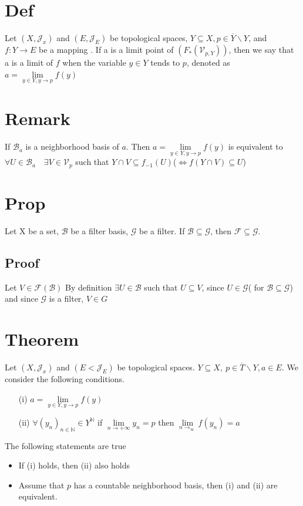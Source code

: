 \documentclass{book}
\begin{document}
\section{Def}
Let $(X,\mathcal{J}_x)$ and $(E,\mathcal{J}_E)$ be topological spaces, $Y\subseteq X, p\in \overline{Y}\backslash Y$, and $f: Y\rightarrow E$ be a mapping . If a is a limit point of $(F_*(\mathcal{V}_{p,Y}))$, then we say that a is a limit of $f$ when the variable $y\in Y$ tends to $p$, denoted as $a=\lim\limits_{y\in Y,y\rightarrow p}f(y)$
\section{Remark}
If $\mathscr{B}_a$ is a neighborhood basis of $a$. Then $a=\lim\limits_{y\in Y,y\rightarrow p}f(y) $ is equivalent to $\forall U\in \mathscr{B}_a\quad \exists V\in \mathcal{V}_p$ such that $Y\cap V\subseteq f_{-1}(U)$($\Leftrightarrow f(Y\cap V)\subseteq U$)
\section{Prop}
Let X be a set, $\mathscr{B}$ be a filter basis, $\mathscr{G}$ be a filter. If $\mathscr{B}\subseteq\mathscr{G}$, then $\mathcal{F}\subseteq \mathscr{G}$.
\subsection*{Proof}Let $V\in \mathcal{F}(\mathscr{B})$ By definition $\exists U\in \mathscr{B}$ such that $U\subseteq V$, since $U\in \mathscr{G}$( for $\mathscr{B}\subseteq \mathscr{G}$) and since $\mathscr{G}$ is a filter, $V\in G$
\section{Theorem}
Let $(X,\mathcal{J}_x)$ and $(E<\mathcal{J}_E)$ be topological spaces. $Y\subseteq X, \ p\in \overline{T}\backslash Y, a\in E$. We consider the following conditions.
\begin{itemize}
    \item[(i)] $a=\lim\limits_{y\in Y,y\rightarrow p}f(y)$
    \item [(ii)]$\forall (y_n)_{n\in \mathbb{N} }\in Y^\mathbb{N} $ if $\lim\limits_{n\rightarrow +\infty}y_n=p$ then $\lim\limits_{n\rightarrow_\infty}f(y_n)=a$ 
\end{itemize}The following statements are true\begin{itemize}
    \item If (i) holds, then (ii) also holds
    \item Assume that $p$ has a countable neighborhood basis, then (i) and (ii) are equivalent.
\end{itemize}
\end{document}
